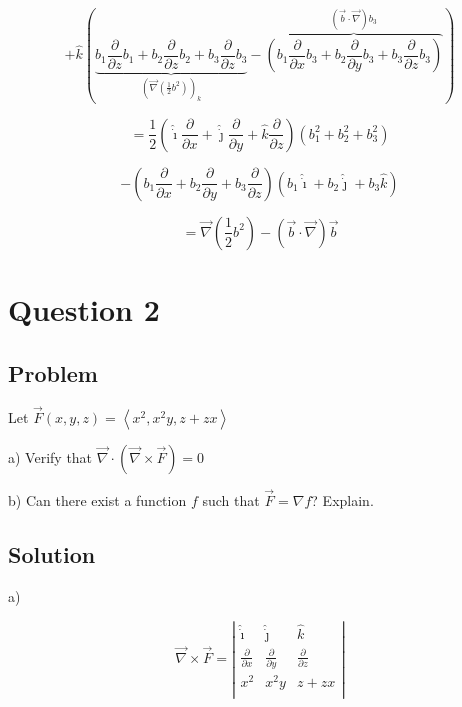 \documentclass[12pt]{article}
\begin{document}
\[
    + \hat{k}
    \left(
    \underbrace{b_{1} \frac{\partial}{\partial z} b_{1}
        + b_{2} \frac{\partial}{\partial z} b_{2}
        + b_{3} \frac{\partial}{\partial z} b_{3}}
    _{{\left(\vec{\nabla} \left(\frac{1}{2} b^2\right)\right)}_k}
    - \overbrace{\left(b_{1} \frac{\partial}{\partial x} b_{3}
        + b_{2} \frac{\partial}{\partial y} b_{3}
        + b_{3} \frac{\partial}{\partial z} b_{3}\right)}
    ^{(\vec{b} \cdot \vec{\nabla}) b_{3}}
    \right)
\]

\[
    =
    \frac{1}{2}
    \left(
    \hat{\dot{\imath}}
    \frac{\partial}{\partial x}
    + \hat{\dot{\jmath}}
    \frac{\partial}{\partial y}
    + \hat{k}
    \frac{\partial}{\partial z}
    \right)
    \left(
    b_{1}^2+b_{2}^2+b_{3}^2
    \right)
\]

\[
    - \left(
    b_{1} \frac{\partial}{\partial x}
    + b_{2} \frac{\partial}{\partial y}
    + b_{3} \frac{\partial}{\partial z}
    \right)
    \left(
    b_{1} \hat{\dot{\imath}}
    + b_{2} \hat{\dot{\jmath}}
    + b_{3} \hat{k}
    \right)
\]

\[
    = \vec{\nabla} \left(\frac{1}{2} b^2\right) - (\vec{b} \cdot \vec{\nabla}) \vec{b}
\]

\newpage
\section{Question 2}

\subsection{Problem}

Let \(\vec{F}(x, y, z)=\left\langle x^2, x^2 y, z+z x\right\rangle \)

a) Verify that \(\vec{\nabla} \cdot(\vec{\nabla} \times \vec{F})=0\)

b) Can there exist a function \(f\) such that \(\vec{F}=\nabla f\)? Explain.

\subsection{Solution}

a)

\[
    \vec{\nabla} \times \vec{F}
    = \left|
    \begin{array}{ccc}
        \hat{\dot{\imath}}          & \hat{\dot{\jmath}}          & \hat{k}                     \\
        \frac{\partial}{\partial x} & \frac{\partial}{\partial y} & \frac{\partial}{\partial z} \\
        x^2                         & x^2 y                       & z+z x                       \\
    \end{array}
    \right|
\]
\end{document}
